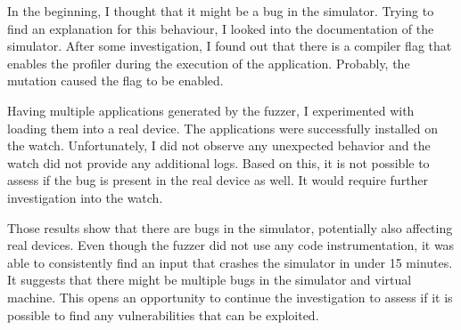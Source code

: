 In the beginning, I thought that it might be a bug in the simulator.
Trying to find an explanation for this behaviour, I looked into the documentation of the simulator.
After some investigation, I found out that there is a compiler flag that enables the profiler during the execution of the application.
Probably, the mutation caused the flag to be enabled.

Having multiple applications generated by the fuzzer, I experimented with loading them into a real device.
The applications were successfully installed on the watch.
Unfortunately, I did not observe any unexpected behavior and the watch did not provide any additional logs.
Based on this, it is not possible to assess if the bug is present in the real device as well.
It would require further investigation into the watch.

Those results show that there are bugs in the simulator, potentially also affecting real devices.
Even though the fuzzer did not use any code instrumentation, it was able to consistently find an input that crashes the simulator in under 15 minutes.
It suggests that there might be multiple bugs in the simulator and virtual machine.
This opens an opportunity to continue the investigation to assess if it is possible to find any vulnerabilities that can be exploited.